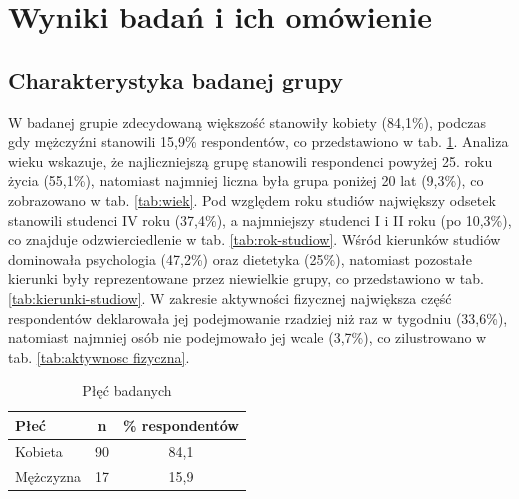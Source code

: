 \section{Wyniki badań i ich omówienie}\label{Wyniki badań i ich omówienie}

\subsection{Charakterystyka badanej grupy}

W badanej grupie zdecydowaną większość stanowiły kobiety (84,1\%), podczas gdy mężczyźni stanowili 15,9\% respondentów, co przedstawiono w tab. \ref{tab:plec-badanych}. Analiza wieku wskazuje, że najliczniejszą grupę stanowili respondenci powyżej 25. roku życia (55,1\%), natomiast najmniej liczna była grupa poniżej 20 lat (9,3\%), co zobrazowano w tab. \ref{tab:wiek}. Pod względem roku studiów największy odsetek stanowili studenci IV roku (37,4\%), a najmniejszy studenci I i II roku (po 10,3\%), co znajduje odzwierciedlenie w tab. \ref{tab:rok-studiow}. Wśród kierunków studiów dominowała psychologia (47,2\%) oraz dietetyka (25\%), natomiast pozostałe kierunki były reprezentowane przez niewielkie grupy, co przedstawiono w tab. \ref{tab:kierunki-studiow}. W zakresie aktywności fizycznej największa część respondentów deklarowała jej podejmowanie rzadziej niż raz w tygodniu (33,6\%), natomiast najmniej osób nie podejmowało jej wcale (3,7\%), co zilustrowano w tab. \ref{tab:aktywnosc fizyczna}.


\begin{table}[H]
    \centering
    \caption{Płęć badanych}
    \label{tab:plec-badanych}
    \begin{tabular}{|l|c|c|}
        \hline
        \textbf{Płeć} & \textbf{n} & \textbf{\% respondentów} \\
        \hline
        \hline
        Kobieta & 90 & 84,1 \\
        \hline
        Mężczyzna & 17 &  15,9\\
        \hline
    \end{tabular}
\end{table}


